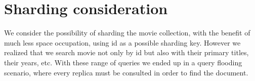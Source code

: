 \section{Sharding consideration}
We consider the possibility of sharding the movie collection, with the benefit of much less space occupation, using id as a possible sharding key. However we realized that we search movie not only by id but also with their primary titles, their years, etc. With these range of queries we ended up in a query flooding scenario, where every replica must be consulted in order to find the document.
